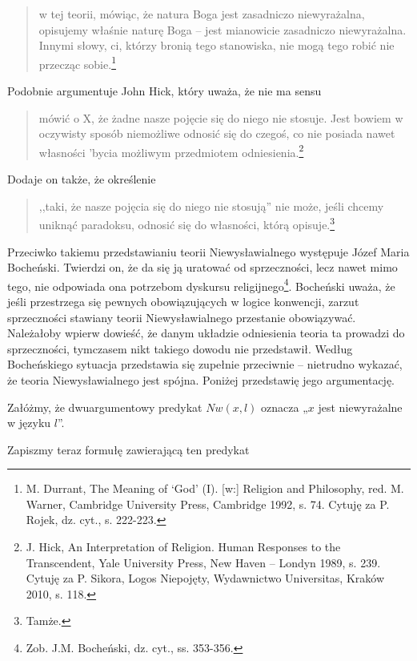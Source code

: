 \begin{quote}
    w tej teorii, mówiąc, że natura Boga jest zasadniczo niewyrażalna,
opisujemy właśnie naturę Boga -- jest mianowicie zasadniczo
niewyrażalna. Innymi słowy, ci, którzy bronią tego stanowiska, nie mogą
tego robić nie przecząc sobie.\footnote{M. Durrant, The Meaning of
‘God’ (I). [w:] Religion and Philosophy, red.  M. Warner, Cambridge
University Press, Cambridge 1992, s. 74. Cytuję za P. Rojek, dz. cyt.,
s. 222-223. }
\end{quote}


Podobnie argumentuje John Hick, który uważa, że nie ma sensu


\begin{quote}
mówić o X, że żadne nasze pojęcie się do niego nie stosuje. Jest bowiem
w oczywisty sposób niemożliwe odnosić się do czegoś, co nie posiada
nawet własności 'bycia możliwym przedmiotem
odniesienia.\footnote{J. Hick, An Interpretation of Religion. Human
Responses to the Transcendent, Yale University Press, New Haven –
Londyn 1989, s. 239. Cytuję za P. Sikora, Logos Niepojęty, Wydawnictwo
Universitas, Kraków 2010, s. 118. }
\end{quote}


Dodaje on także, że określenie

\begin{quote}
,,taki, że nasze pojęcia się do niego nie stosują'' nie może,
jeśli chcemy uniknąć paradoksu, odnosić się do własności, którą
opisuje.\footnote{Tamże. }
\end{quote}

Przeciwko takiemu przedstawianiu teorii Niewysławialnego występuje Józef
Maria Bocheński. Twierdzi on, że da się ją uratować od sprzeczności,
lecz nawet mimo tego, nie odpowiada ona potrzebom dyskursu
religijnego\footnote{Zob. J.M. Bocheński, dz. cyt., ss. 353-356.
}. Bocheński uważa, że jeśli przestrzega się pewnych obowiązujących w
logice konwencji, zarzut sprzeczności stawiany teorii Niewysławialnego
przestanie obowiązywać. Należałoby wpierw dowieść, że danym układzie
odniesienia teoria ta prowadzi do sprzeczności, tymczasem nikt takiego
dowodu nie przedstawił. Według Bocheńskiego sytuacja przedstawia się
zupełnie przeciwnie -- nietrudno wykazać, że teoria Niewysławialnego
jest spójna. Poniżej przedstawię jego argumentację.

Załóżmy, że dwuargumentowy predykat  $Nw(x,l)$ oznacza „$x$ jest
niewyrażalne w języku $l$”.

Zapiszmy teraz formułę zawierającą ten predykat

